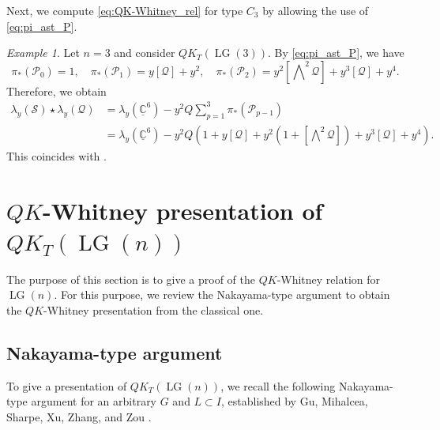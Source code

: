 \documentclass[a4paper, 11pt, reqno]{amsart}
\numberwithin{equation}{section}
\newcommand{\BC}{\mathbb{C}}
\newcommand{\udBC}{\underline{\BC}}
\newcommand{\CP}{\mathcal{P}}
\newcommand{\CQ}{\mathcal{Q}}
\newcommand{\CS}{\mathcal{S}}
\newcommand{\LG}{\operatorname{LG}}
\newcommand{\class}[1]{\left[ #1 \right]}
\newcommand{\extprod}{\bigwedge\nolimits}
\theoremstyle{plain}
\theoremstyle{definition}
\theoremstyle{remark}
\newtheorem{exm}[thm]{Example}
\begin{document}
Next, we compute \eqref{eq:QK-Whitney_rel} for type $C_{3}$ by allowing the use of \eqref{eq:pi_ast_P}. 
\begin{exm}
Let $n = 3$ and consider $QK_{T}(\LG(3))$. By \eqref{eq:pi_ast_P}, we have 
\begin{equation}
\pi_{\ast}(\CP_{0}) = 1, \quad \pi_{\ast}(\CP_{1}) = y \class{\CQ} + y^{2}, \quad \pi_{\ast}(\CP_{2}) = y^{2}\class{\extprod^{2} \CQ} + y^{3} \class{\CQ} + y^{4}. 
\end{equation}
Therefore, we obtain 
\begin{align}
\lambda_{y}(\CS) \star \lambda_{y}(\CQ) &= \lambda_{y}(\udBC^{6}) - y^{2} Q \sum_{p=1}^{3} \pi_{\ast}(\CP_{p-1}) \\ 
&= \lambda_{y}(\udBC^{6}) - y^{2}Q \left(1 + y \class{\CQ} + y^{2}\left( 1 + \class{\extprod^{2}\CQ} \right) + y^{3} \class{\CQ} + y^{4} \right). 
\end{align}
This coincides with \cite[(7.67)]{GMSZ}. 
\end{exm}

\section{\texorpdfstring{$QK$-Whitney presentation of $QK_{T}(\LG(n))$}{QK-Whitney presentation of QKT(LG(n))}} \label{sec:presentation}
The purpose of this section is to give a proof of the $QK$-Whitney relation for $\LG(n)$. For this purpose, we review the Nakayama-type argument to obtain the $QK$-Whitney presentation from the classical one. 

\subsection{Nakayama-type argument}
To give a presentation of $QK_{T}(\LG(n))$, we recall the following Nakayama-type argument for an arbitrary $G$ and $L \subset I$, established by Gu, Mihalcea, Sharpe, Xu, Zhang, and Zou \cite{GMSXZZ2}. 
\end{document}
